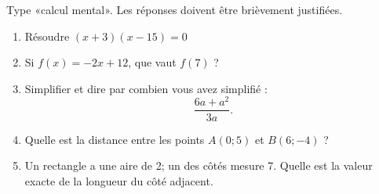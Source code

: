 
\begin{exercice}[\ldots/5]\label{exosmath-0601}

    Type «calcul mental». Les réponses doivent être brièvement justifiées.
    \begin{enumerate}
        \item
            Résoudre \( (x+3)(x-15)=0\)
        \item
            Si \( f(x)=-2x+12\), que vaut \( f(7)\) ?
        \item
            Simplifier et dire par combien vous avez simplifié :
            \begin{equation*}
                \frac{ 6a+a^2 }{ 3a }.
            \end{equation*}
        \item
            Quelle est la distance entre les points \( A(0;5)\) et \( B(6;-4)\) ?
        \item
            Un rectangle a une aire de \unit{2}{\centi\meter\squared}; un des côtés mesure \unit{7}{\centi\meter}. Quelle est la valeur exacte de la longueur du côté adjacent.
    \end{enumerate}

\end{exercice}
